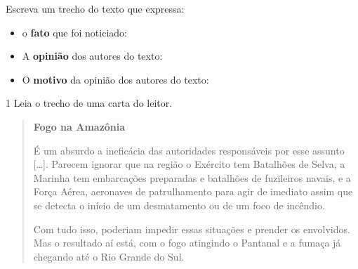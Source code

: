 \begin{escolha}
\item Escreva um trecho do texto que expressa:


\begin{itemize}
\item o \textbf{fato} que foi noticiado: 

\item A \textbf{opinião} dos autores do texto: 
  
\item O \textbf{motivo} da opinião dos autores do texto: 
\end{itemize}

\end{escolha}


\num{1} Leia o trecho de uma carta do leitor.

\begin{quote}
\textbf{Fogo na Amazônia}

É um absurdo a ineficácia das autoridades responsáveis por esse assunto
{[}\ldots{}{]}. Parecem ignorar que na região o Exército tem Batalhões
de Selva, a Marinha tem embarcações preparadas e batalhões de fuzileiros
navais, e a Força Aérea, aeronaves de patrulhamento para agir de
imediato assim que se detecta o início de um desmatamento ou de um foco
de incêndio.

Com tudo isso, poderiam impedir essas situações e prender os envolvidos.
Mas o resultado aí está, com o fogo atingindo o Pantanal e a fumaça já
chegando até o Rio Grande do Sul.

\end{quote}

